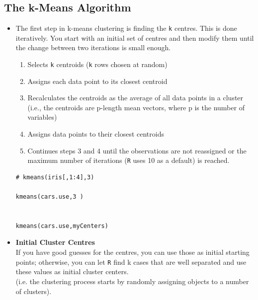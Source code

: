 \documentclass[12pt]{article}
\begin{document}
\subsection{The k-Means Algorithm}
\begin{itemize}

\item The first step in k-means clustering is finding the \texttt{k} centres. This is done iteratively. You start with an initial set of centres and then modify them until the change between two iterations is small enough.

\begin{enumerate}
\item Selects \texttt{k} centroids (\texttt{k} rows chosen at random)
\item Assigns each data point to its closest centroid
\item Recalculates the centroids as the average of all data points in a cluster (i.e., the centroids are p-length mean vectors, where p is the number of variables)
\item Assigns data points to their closest centroids
\item Continues steps 3 and 4 until the observations are not reassigned or the maximum number of iterations (\texttt{R} uses 10 as a default) is reached.
\end{enumerate}

\newpage
\begin{framed}
\begin{verbatim}
# kmeans(iris[,1:4],3)

kmeans(cars.use,3 )


kmeans(cars.use,myCenters)

\end{verbatim}
\end{framed}
\newpage
\item \textbf{Initial Cluster Centres} \\If you have good guesses for the centres, you can use those
as initial starting points; otherwise, you can let \texttt{R} find k cases that are well separated and use these values as initial cluster centers. \\ (i.e. the clustering process starts by randomly assigning objects to a number of
clusters).
\bigskip


\end{itemize}
\end{document}
